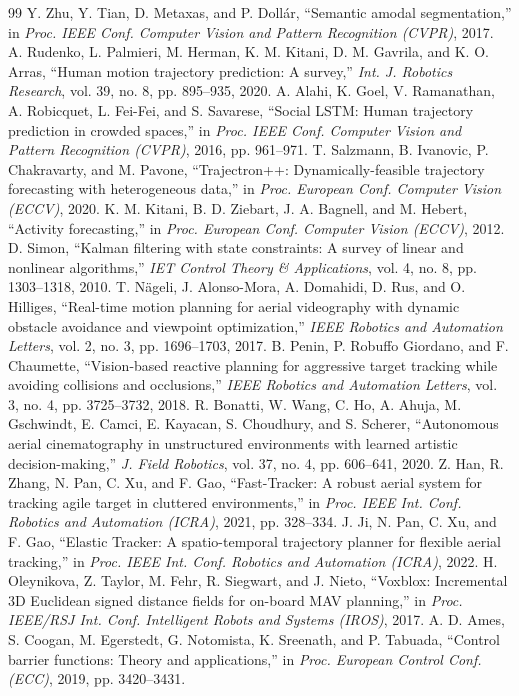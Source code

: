 \documentclass[12pt,a4paper]{article}
\begin{document}
\begin{thebibliography}{99}
 Y. Zhu, Y. Tian, D. Metaxas, and P. Dollár, ``Semantic amodal segmentation,'' in \emph{Proc. IEEE Conf. Computer Vision and Pattern Recognition (CVPR)}, 2017.
 A. Rudenko, L. Palmieri, M. Herman, K. M. Kitani, D. M. Gavrila, and K. O. Arras, ``Human motion trajectory prediction: A survey,'' \emph{Int. J. Robotics Research}, vol. 39, no. 8, pp. 895–935, 2020.
 A. Alahi, K. Goel, V. Ramanathan, A. Robicquet, L. Fei-Fei, and S. Savarese, ``Social LSTM: Human trajectory prediction in crowded spaces,'' in \emph{Proc. IEEE Conf. Computer Vision and Pattern Recognition (CVPR)}, 2016, pp. 961–971.
 T. Salzmann, B. Ivanovic, P. Chakravarty, and M. Pavone, ``Trajectron++: Dynamically-feasible trajectory forecasting with heterogeneous data,'' in \emph{Proc. European Conf. Computer Vision (ECCV)}, 2020.
 K. M. Kitani, B. D. Ziebart, J. A. Bagnell, and M. Hebert, ``Activity forecasting,'' in \emph{Proc. European Conf. Computer Vision (ECCV)}, 2012.
 D. Simon, ``Kalman filtering with state constraints: A survey of linear and nonlinear algorithms,'' \emph{IET Control Theory \& Applications}, vol. 4, no. 8, pp. 1303–1318, 2010.
 T. Nägeli, J. Alonso-Mora, A. Domahidi, D. Rus, and O. Hilliges, ``Real-time motion planning for aerial videography with dynamic obstacle avoidance and viewpoint optimization,'' \emph{IEEE Robotics and Automation Letters}, vol. 2, no. 3, pp. 1696–1703, 2017.
 B. Penin, P. Robuffo Giordano, and F. Chaumette, ``Vision-based reactive planning for aggressive target tracking while avoiding collisions and occlusions,'' \emph{IEEE Robotics and Automation Letters}, vol. 3, no. 4, pp. 3725–3732, 2018.
 R. Bonatti, W. Wang, C. Ho, A. Ahuja, M. Gschwindt, E. Camci, E. Kayacan, S. Choudhury, and S. Scherer, ``Autonomous aerial cinematography in unstructured environments with learned artistic decision-making,'' \emph{J. Field Robotics}, vol. 37, no. 4, pp. 606–641, 2020.
 Z. Han, R. Zhang, N. Pan, C. Xu, and F. Gao, ``Fast-Tracker: A robust aerial system for tracking agile target in cluttered environments,'' in \emph{Proc. IEEE Int. Conf. Robotics and Automation (ICRA)}, 2021, pp. 328–334.
 J. Ji, N. Pan, C. Xu, and F. Gao, ``Elastic Tracker: A spatio-temporal trajectory planner for flexible aerial tracking,'' in \emph{Proc. IEEE Int. Conf. Robotics and Automation (ICRA)}, 2022.
 H. Oleynikova, Z. Taylor, M. Fehr, R. Siegwart, and J. Nieto, ``Voxblox: Incremental 3D Euclidean signed distance fields for on-board MAV planning,'' in \emph{Proc. IEEE/RSJ Int. Conf. Intelligent Robots and Systems (IROS)}, 2017.
 A. D. Ames, S. Coogan, M. Egerstedt, G. Notomista, K. Sreenath, and P. Tabuada, ``Control barrier functions: Theory and applications,'' in \emph{Proc. European Control Conf. (ECC)}, 2019, pp. 3420–3431.
\end{thebibliography}
\end{document}
